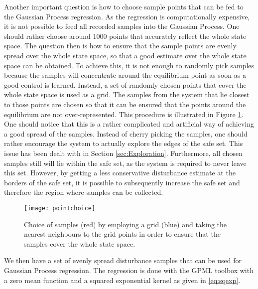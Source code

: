 \documentclass[../main.tex]{subfiles}
\begin{document}
Another important question is how to choose sample points that can be fed to the Gaussian Process regression. As the regression is computationally expensive, it is not possible to feed all recorded samples into the Gaussian Process. One should rather choose around $1000$ points that accurately reflect the whole state space. The question then is how to ensure that the sample points are evenly spread over the whole state space, so that a good estimate over the whole state space can be obtained. To achieve this, it is not enough to randomly pick samples because the samples will concentrate around the equilibrium point as soon as a good control is learned. Instead, a set of randomly chosen points that cover the whole state space is used as a grid. The samples from the system that lie closest to those points are chosen so that it can be ensured that the points around the equilibrium are not over-represented.  This procedure is illustrated in Figure \ref{fig:pointchoice}. One should notice that this is a rather complicated and artificial way of achieving a good spread of the samples. Instead of cherry picking the samples, one should rather encourage the system to actually explore the edges of the safe set. This issue has been dealt with in Section \ref{sec:Exploration}. Furthermore, all chosen samples still will lie within the safe set, as the system is required to never leave this set. However, by getting a less conservative disturbance estimate at the borders of the safe set, it is possible to subsequently increase the safe set and therefore the region where samples can be collected.

\begin{figure}
    \centering
    \texttt{[image: pointchoice]}
        \caption{Choice of samples (red) by employing a grid (blue) and taking the nearest neighbours to the grid points in order to ensure that the samples cover the whole state space.}  \label{fig:pointchoice}
\end{figure}

We then have a set of evenly spread disturbance samples that can be used for Gaussian Process regression. The regression is done with the GPML toolbox \cite{Rasmussen:2010:GPM:1756006.1953029} with a zero mean function and a squared exponential kernel as given in \eqref{eq:sqexp}.
\end{document}
